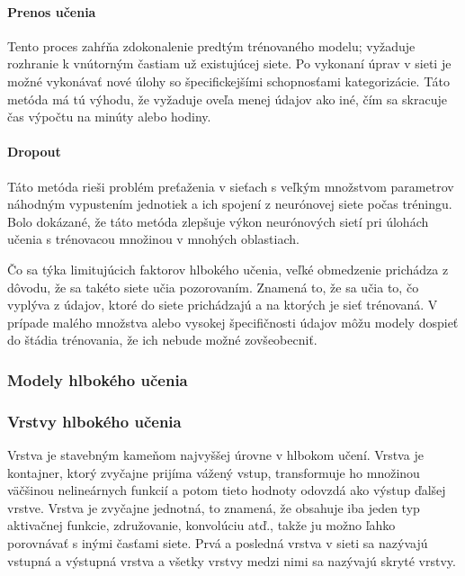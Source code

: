 \paragraph{Prenos učenia} Tento proces zahŕňa zdokonalenie predtým trénovaného modelu; vyžaduje rozhranie k vnútorným častiam už existujúcej siete. Po vykonaní úprav v sieti je možné vykonávať nové úlohy so špecifickejšími schopnosťami kategorizácie. Táto metóda má tú výhodu, že vyžaduje oveľa menej údajov ako iné, čím sa skracuje čas výpočtu na minúty alebo hodiny.
\paragraph{Dropout} Táto metóda rieši problém preťaženia v sieťach s veľkým množstvom parametrov náhodným vypustením jednotiek a ich spojení z neurónovej siete počas tréningu. Bolo dokázané, že táto metóda zlepšuje výkon neurónových sietí pri úlohách učenia s trénovacou množinou v mnohých oblastiach. 

Čo sa týka limitujúcich faktorov hlbokého učenia, veľké obmedzenie prichádza z dôvodu, že sa takéto siete učia pozorovaním. Znamená to, že sa učia to, čo vyplýva z údajov, ktoré do siete prichádzajú a na ktorých je sieť trénovaná. V prípade malého množstva alebo vysokej špecifičnosti údajov môžu modely dospieť do štádia trénovania, že ich nebude možné zovšeobecniť.


\subsubsection{Modely hlbokého učenia}

\subsubsection{Vrstvy hlbokého učenia}
Vrstva je stavebným kameňom najvyššej úrovne v hlbokom učení. Vrstva je kontajner, ktorý zvyčajne prijíma vážený vstup, transformuje ho množinou väčšinou nelineárnych funkcií a potom tieto hodnoty odovzdá ako výstup ďalšej vrstve. Vrstva je zvyčajne jednotná, to znamená, že obsahuje iba jeden typ aktivačnej funkcie, združovanie, konvolúciu atď., takže ju možno ľahko porovnávať s inými časťami siete. Prvá a posledná vrstva v sieti sa nazývajú vstupná a výstupná vrstva a všetky vrstvy medzi nimi sa nazývajú skryté vrstvy.




